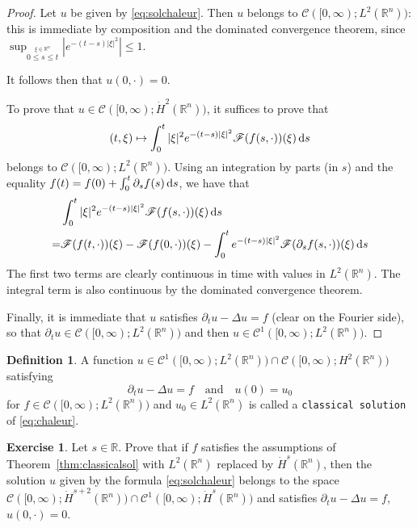 \documentclass[a4paper, 12pt]{article}
\theoremstyle{plain}
\theoremstyle{definition}
\newtheorem{definition}[proposition]{Definition}
\newtheorem{exercise}{Exercise}
\theoremstyle{remark}
\numberwithin{equation}{section}
\begin{document}
\begin{proof}
Let $u$ be given by \eqref{eq:solchaleur}. Then $u$ belongs to ${\mathscr{C}}([0,\infty);L^2({\mathds{R}}^n))$: this is immediate 
by composition and the dominated convergence theorem, since 
$\displaystyle{\sup_{\stackrel{\xi\in{\mathds{R}}^n}{0\le s\le t}}|e^{-(t-s)|\xi|^2}|\le 1}$.

\noindent
It follows then that $u(0,\cdot)=0$.

\noindent
To prove that $u\in {\mathscr{C}}([0,\infty);\dot H^2({\mathds{R}}^n))$, it suffices to prove that 
\[
(t,\xi)\mapsto \int_0^t |\xi|^2 e^{-(t-s)|\xi|^2}{\mathscr{F}}(f(s,\cdot))(\xi)\,{\rm d}s
\] 
belongs to ${\mathscr{C}}([0,\infty);L^2({\mathds{R}}^n))$. Using an integration by parts (in $s$) and
the equality $f(t)=f(0)+\int_0^t \partial_sf(s)\,{\rm d}s$,
we have that
%
\begin{align*}
&\int_0^t |\xi|^2 e^{-(t-s)|\xi|^2}{\mathscr{F}}(f(s,\cdot))(\xi)\,{\rm d}s\\
=& {\mathscr{F}}(f(t,\cdot))(\xi) - {\mathscr{F}}(f(0,\cdot))(\xi) -\int_0^te^{-(t-s)|\xi|^2}{\mathscr{F}}(\partial_sf(s,\cdot))(\xi)\,{\rm d}s
\end{align*}
%
The first two terms are clearly continuous in time with values in $L^2({\mathds{R}}^n)$. The integral term is also continuous by the 
dominated convergence theorem.

\noindent
Finally, it is immediate that $u$ satisfies $\partial_t u-\Delta u = f$ (clear on the Fourier side), so that 
$\partial_t u\in {\mathscr{C}}([0,\infty);L^2({\mathds{R}}^n))$ and then $u\in  {\mathscr{C}}^1([0,\infty);L^2({\mathds{R}}^n))$.
\end{proof}

\begin{definition}
A function $u\in {\mathscr{C}}^1([0,\infty);L^2({\mathds{R}}^n))\cap {\mathscr{C}}([0,\infty);H^2({\mathds{R}}^n))$ satisfying
\[
\partial_t u-\Delta u =f \quad \mbox{and} \quad u(0)=u_0
\]
for $f\in {\mathscr{C}}([0,\infty);L^2({\mathds{R}}^n))$ and $u_0\in L^2({\mathds{R}}^n)$
is called a {\tt classical solution} of \eqref{eq:chaleur}.
\end{definition}

\begin{exercise}
Let $s\in{\mathds{R}}$.
Prove that if $f$ satisfies the assumptions of Theorem~\ref{thm:classicalsol} with $L^2({\mathds{R}}^n)$ replaced by 
$\dot H^s({\mathds{R}}^n)$, then the solution $u$ given by the formula \eqref{eq:solchaleur} belongs to the space
${\mathscr{C}}([0,\infty);\dot H^{s+2}({\mathds{R}}^n))\cap {\mathscr{C}}^1([0,\infty);\dot H^s({\mathds{R}}^n))$ and
satisfies $\partial_tu-\Delta u=f$, $u(0, \cdot)=0$.
\end{exercise}
\end{document}
